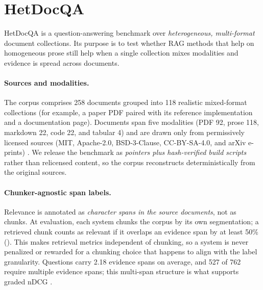 \documentclass[10pt,twocolumn]{article}
\begin{document}
\section{HetDocQA}\label{sec:hetdocqa}
HetDocQA is a question-answering benchmark over \emph{heterogeneous,
multi-format} document collections. Its purpose is to test whether RAG
methods that help on homogeneous prose still help when a single collection
mixes modalities and evidence is spread across documents.

\paragraph{Sources and modalities.}
The corpus comprises 258 documents grouped into 118 realistic mixed-format
collections (for example, a paper PDF paired with its reference implementation
and a documentation page). Documents span five modalities (PDF 92, prose 118,
markdown 22, code 22, and tabular 4) and are drawn only from permissively
licensed sources (MIT, Apache-2.0, BSD-3-Clause, CC-BY-SA-4.0, and arXiv
e-prints) \cite{husain2019codesearchnet}. We release the benchmark as
\emph{pointers plus hash-verified build scripts} rather than relicensed content,
so the corpus reconstructs deterministically from the original sources.

\paragraph{Chunker-agnostic span labels.}
Relevance is annotated as \emph{character spans in the source documents}, not as
chunks. At evaluation,
each system chunks the corpus by its own segmentation; a retrieved chunk counts as
relevant if it overlaps an evidence span by at least 50\% ().
This makes retrieval metrics independent of chunking, so a system is never
penalized or rewarded for a chunking choice that happens to align with the
label granularity. Questions carry 2.18 evidence spans on average, and 527 of 762
require multiple evidence spans; this multi-span structure is what supports
graded nDCG \cite{jarvelin2002ndcg}.
\end{document}
